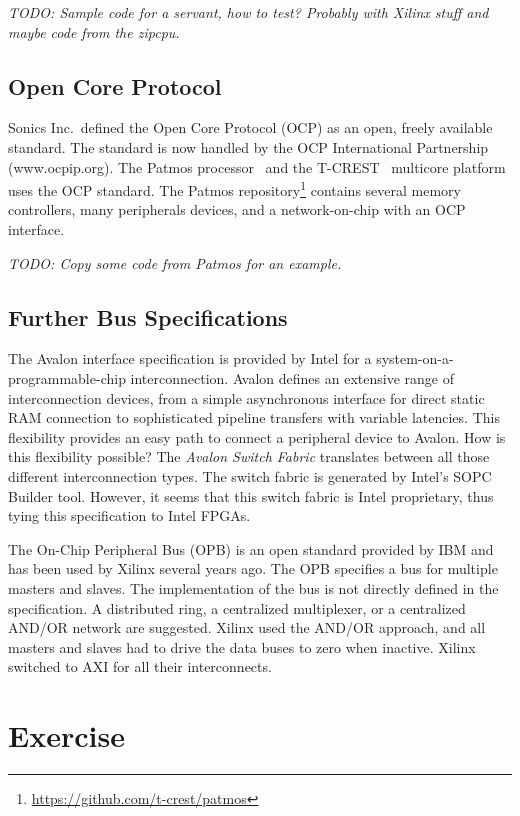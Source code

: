 \documentclass[%
    10pt,
    headinclude, footexclude,
    openright, %
    notitlepage,
    cleardoubleempty,
    headsepline,
    pointlessnumbers,
    bibtotoc, idxtotoc,
    ]{scrbook}
\newcommand{\todo}[1]{{\emph{TODO: #1}}}
\begin{document}
\todo{Sample code for a servant, how to test? Probably with Xilinx stuff and maybe
code from the zipcpu.}

\subsection{Open Core Protocol}

Sonics Inc.\ defined the Open Core Protocol (OCP) \cite{soc:ocp} as
an open, freely available standard. The standard is now handled by
the OCP International Partnership (www.ocpip.org).
The Patmos processor~\cite{patmos:rts2018} and the
T-CREST~\cite{t-crest:2015} multicore platform uses the OCP
standard. The Patmos repository\footnote{\url{https://github.com/t-crest/patmos}}
contains several memory controllers, many peripherals devices,
and a network-on-chip with an OCP interface.

\todo{Copy some code from Patmos for an example.}

\subsection{Further Bus Specifications}

The Avalon \cite{soc:avalon} interface specification is provided by
Intel for a system-\-on-a\--pro\-grammable-\-chip interconnection.
Avalon defines an extensive range of interconnection devices, from
a simple asynchronous interface for direct static RAM
connection to sophisticated pipeline transfers with variable
latencies. This flexibility provides an easy path to connect a
peripheral device to Avalon. How is this flexibility possible? The
\emph{Avalon Switch Fabric} translates between all those different
interconnection types. The switch fabric is generated by Intel's
SOPC Builder tool. However, it seems that this switch fabric is
Intel proprietary, thus tying this specification to Intel FPGAs.

The On-Chip Peripheral Bus (OPB) \cite{soc:opb} is an open standard
provided by IBM and has been used by Xilinx several years ago.
The OPB specifies a bus for
multiple masters and slaves. The implementation of the bus is not
directly defined in the specification. A distributed ring, a
centralized multiplexer, or a centralized AND/OR network are
suggested. Xilinx used the AND/OR approach, and all masters and
slaves had to drive the data buses to zero when inactive.
Xilinx switched to AXI for all their interconnects.

\section{Exercise}
\end{document}
